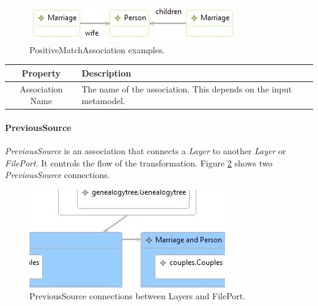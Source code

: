 \begin{figure}[h]
\begin{center}
  \includegraphics[scale=0.7]{imgs/positive_match_example.jpg}
  \caption{PositiveMatchAssociation examples.}
  \label{fig:positive_match_example}
\end{center}
\end{figure}


\begin{center}
  \begin{tabular}{ | c | p{\paragraphsize} | }
    \hline
    \textbf{Property} & \textbf{Description} \\ \hline
    Association Name & The name of the association. This depends on the input
  metamodel.  \\
    \hline
  \end{tabular}
\end{center}


\paragraph{PreviousSource}

\emph{PreviousSource} is an association that connects a \emph{Layer} to another
\emph{Layer} or \emph{FilePort}. It controls the flow of the transformation.
Figure \ref{fig:two_previous_sources} shows two \emph{PreviousSource}
connections.

\begin{figure}[h]
\begin{center}
  \includegraphics[scale=0.7]{imgs/two_previous_sources.jpg}
  \caption{PreviousSource connections between Layers and FilePort.}
  \label{fig:two_previous_sources}
\end{center}
\end{figure}
